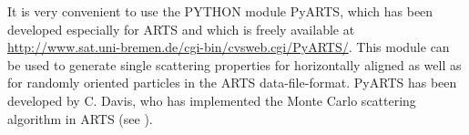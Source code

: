 It is very convenient to use the PYTHON module PyARTS, which has been
developed especially for ARTS and which is freely available at
\href{http://www.sat.uni-bremen.de/cgi-bin/cvsweb.cgi/PyARTS/}
{\url{http://www.sat.uni-bremen.de/cgi-bin/cvsweb.cgi/PyARTS/}}. This
module can be used to generate single scattering properties for
horizontally aligned as well as for randomly oriented particles in the
ARTS data-file-format. PyARTS has been developed by C. Davis, who has
implemented the Monte Carlo scattering algorithm in ARTS (see
).

